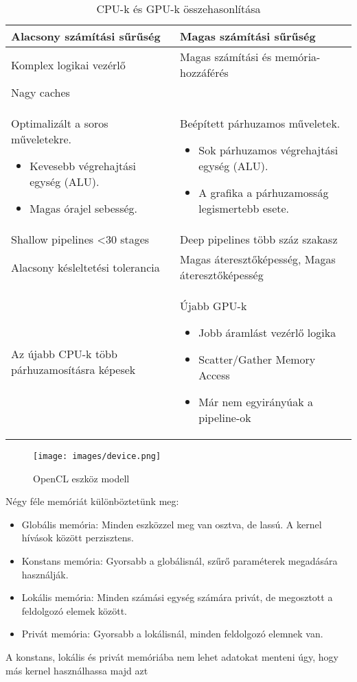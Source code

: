 \begin{table}[h!]
\centering
\caption{CPU-k és GPU-k összehasonlítása}
\medskip
\label{tab:cpuvsgpu}
\begin{tabular}{|p{7cm}|p{7cm}|}
\hline
Alacsony számítási sűrűség & Magas számítási sűrűség \\
\hline
Komplex logikai vezérlő & Magas számítási és memória-hozzáférés \\
\hline
Nagy caches &   \\
\hline
Optimalizált a soros műveletekre.
\begin{itemize}
	\item Kevesebb végrehajtási egység (ALU).
	\item Magas órajel sebesség.
\end{itemize} & Beépített párhuzamos műveletek.
\begin{itemize}
	\item Sok párhuzamos végrehajtási egység (ALU).
	\item A grafika a párhuzamosság legismertebb esete.
\end{itemize} \\
\hline
Shallow pipelines <30 stages & Deep pipelines több száz szakasz \\
\hline
Alacsony késleltetési tolerancia & Magas áteresztőképesség, Magas áteresztőképesség \\
\hline
Az újabb CPU-k több párhuzamosításra képesek & Újabb GPU-k
\begin{itemize}
	\item Jobb áramlást vezérlő logika
	\item Scatter/Gather Memory Access
	\item Már nem egyirányúak a pipeline-ok
\end{itemize} \\
\hline
\end{tabular}
\end{table}


\begin{figure}[h!]
\centering
\texttt{[image: images/device.png]}
\caption{OpenCL eszköz modell}
\label{fig:opencl}
\end{figure}

Négy féle memóriát különböztetünk meg:
\begin{itemize}
\item Globális memória: Minden eszközzel meg van osztva, de lassú. A kernel hívások között perzisztens. 
\item Konstans memória: Gyorsabb a globálisnál, szűrő paraméterek megadására használják.
\item Lokális memória: Minden számási egység számára privát, de megosztott a feldolgozó elemek között.
\item Privát memória: Gyorsabb a lokálisnál, minden feldolgozó elemnek van.
\end{itemize} 
A konstans, lokális és privát memóriába nem lehet adatokat menteni úgy, hogy más kernel használhassa majd azt

